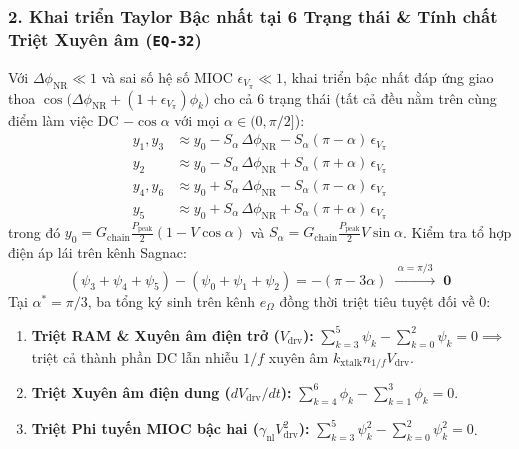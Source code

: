 \documentclass[11pt, a4paper]{article}
\begin{document}
\subsubsection*{2. Khai triển Taylor Bậc nhất tại 6 Trạng thái \& Tính chất Triệt Xuyên âm (\texttt{EQ-32})}
Với $\Delta\phi_{\text{NR}} \ll 1$ và sai số hệ số MIOC $\epsilon_{V_\pi} \ll 1$, khai triển bậc nhất đáp ứng giao thoa $\cos\!\bigl(\Delta\phi_{\text{NR}} + (1+\epsilon_{V_\pi})\phi_k\bigr)$ cho cả 6 trạng thái (tất cả đều nằm trên cùng điểm làm việc DC $-\cos\alpha$ với mọi $\alpha \in (0, \pi/2]$):
\begin{align}
y_1, y_3 &\approx y_0 - S_\alpha\,\Delta\phi_{\text{NR}} - S_\alpha(\pi - \alpha)\,\epsilon_{V_\pi} \\
y_2 &\approx y_0 - S_\alpha\,\Delta\phi_{\text{NR}} + S_\alpha(\pi + \alpha)\,\epsilon_{V_\pi} \\
y_4, y_6 &\approx y_0 + S_\alpha\,\Delta\phi_{\text{NR}} - S_\alpha(\pi - \alpha)\,\epsilon_{V_\pi} \\
y_5 &\approx y_0 + S_\alpha\,\Delta\phi_{\text{NR}} + S_\alpha(\pi + \alpha)\,\epsilon_{V_\pi}
\end{align}
trong đó $y_0 = G_{\text{chain}}\frac{P_{\text{peak}}}{2}(1 - V\cos\alpha)$ và $S_\alpha = G_{\text{chain}}\frac{P_{\text{peak}}}{2}V\sin\alpha$. Kiểm tra tổ hợp điện áp lái trên kênh Sagnac:
\begin{equation}
(\psi_3 + \psi_4 + \psi_5) - (\psi_0 + \psi_1 + \psi_2) = -(\pi - 3\alpha) \;\xrightarrow{\;\alpha = \pi/3\;}\; \mathbf{0}
\end{equation}
Tại $\alpha^* = \pi/3$, ba tổng ký sinh trên kênh $e_\Omega$ đồng thời triệt tiêu tuyệt đối về $0$:
\begin{enumerate}
    \item \textbf{Triệt RAM \& Xuyên âm điện trở ($V_{\text{drv}}$):} $\sum_{k=3}^{5}\psi_k - \sum_{k=0}^{2}\psi_k = 0 \implies$ triệt cả thành phần DC lẫn nhiễu $1/f$ xuyên âm $k_{\text{xtalk}} n_{1/f} V_{\text{drv}}$.
    \item \textbf{Triệt Xuyên âm điện dung ($dV_{\text{drv}}/dt$):} $\sum_{k=4}^{6}\phi_k - \sum_{k=1}^{3}\phi_k = 0$.
    \item \textbf{Triệt Phi tuyến MIOC bậc hai ($\gamma_{\text{nl}}V_{\text{drv}}^2$):} $\sum_{k=3}^{5}\psi_k^2 - \sum_{k=0}^{2}\psi_k^2 = 0$.
\end{enumerate}
\end{document}

